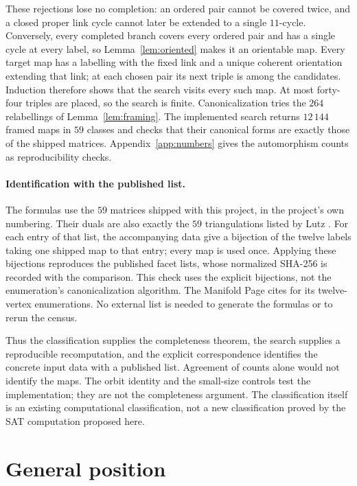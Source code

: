 \documentclass[11pt,reqno]{amsart}
\theoremstyle{plain}
\theoremstyle{definition}
\begin{document}
These rejections lose no completion: an ordered pair cannot be covered twice,
and a closed proper link cycle cannot later be extended to a single $11$-cycle.
Conversely, every completed branch covers every ordered pair and has a single
cycle at every label, so Lemma~\ref{lem:oriented} makes it an orientable map.
Every target map has a labelling with the fixed link and a unique coherent
orientation extending that link; at each chosen pair its next triple is among
the candidates. Induction therefore shows that the search visits every such
map. At most forty-four triples are placed, so the search is finite.
Canonicalization tries the $264$ relabellings of Lemma~\ref{lem:framing}.
The implemented search returns $12\,144$ framed maps in $59$ classes and checks
that their canonical forms are exactly those of the shipped matrices.
Appendix~\ref{app:numbers} gives the automorphism counts as reproducibility checks.

\paragraph{Identification with the published list.}
The formulas use the $59$ matrices shipped with this project, in the project's
own numbering. Their duals are also exactly the $59$ triangulations listed by
Lutz \cite{LutzManifoldPage}. For each entry of that list, the accompanying data
give a bijection of the twelve labels taking one shipped map to that entry;
every map is used once. Applying these bijections reproduces the published facet
lists, whose normalized SHA-256 is recorded with the comparison. This check
uses the explicit bijections, not the enumeration's canonicalization algorithm.
The Manifold Page cites \cite{SulankeLutz2009,EllinghamStephens2005} for its
twelve-vertex enumerations. No external list is needed to generate the formulas
or to rerun the census.

Thus the classification supplies the completeness theorem, the search supplies
a reproducible recomputation, and the explicit correspondence identifies the
concrete input data with a published list. Agreement of counts alone would not
identify the maps. The orbit identity and the small-size controls test the
implementation; they are not the completeness argument. The classification
itself is an existing computational classification, not a new classification
proved by the SAT computation proposed here.

\section{General position}\label{sec:genpos}
\end{document}
